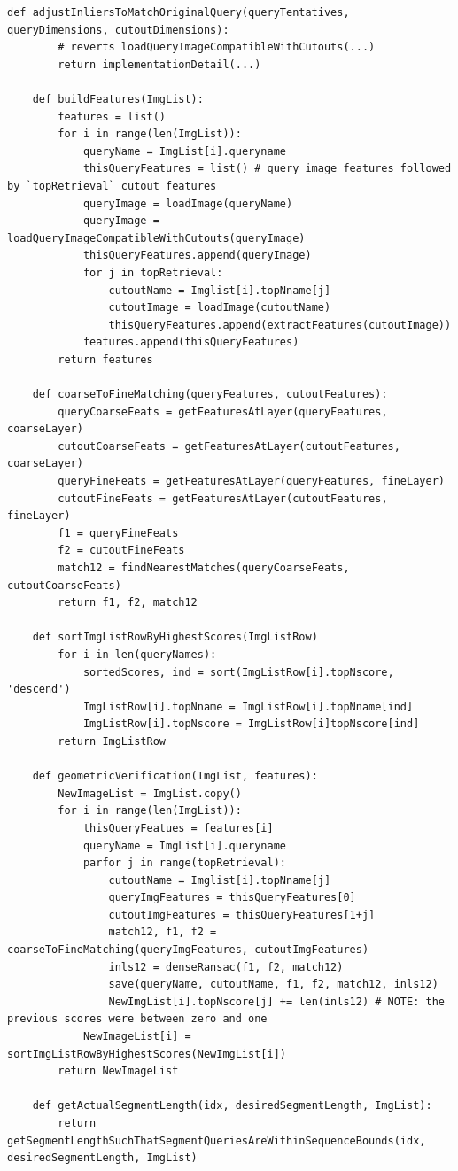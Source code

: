 \documentclass[twoside]{ctuthesis}
\theoremstyle{plain}
\theoremstyle{definition}
\theoremstyle{note}
\newcommand{\todo}[1][]{%
\ifthenelse{\isempty{#1}}{\textbf{TODO}}{\textbf{TODO: #1}}%
}
\begin{document}
\begin{lstlisting}[style=pseudocode, caption={InLocCIIRC pseudocode. \todo[pseudocode review.]}]
	def adjustInliersToMatchOriginalQuery(queryTentatives, queryDimensions, cutoutDimensions):
		# reverts loadQueryImageCompatibleWithCutouts(...)
		return implementationDetail(...)

	def buildFeatures(ImgList):
		features = list()
		for i in range(len(ImgList)):
			queryName = ImgList[i].queryname
			thisQueryFeatures = list() # query image features followed by `topRetrieval` cutout features
			queryImage = loadImage(queryName)
			queryImage = loadQueryImageCompatibleWithCutouts(queryImage)
			thisQueryFeatures.append(queryImage)
			for j in topRetrieval:
				cutoutName = Imglist[i].topNname[j]
				cutoutImage = loadImage(cutoutName)
				thisQueryFeatures.append(extractFeatures(cutoutImage))
			features.append(thisQueryFeatures)
		return features

	def coarseToFineMatching(queryFeatures, cutoutFeatures):
		queryCoarseFeats = getFeaturesAtLayer(queryFeatures, coarseLayer)
		cutoutCoarseFeats = getFeaturesAtLayer(cutoutFeatures, coarseLayer)
		queryFineFeats = getFeaturesAtLayer(queryFeatures, fineLayer)
		cutoutFineFeats = getFeaturesAtLayer(cutoutFeatures, fineLayer)
		f1 = queryFineFeats
		f2 = cutoutFineFeats
		match12 = findNearestMatches(queryCoarseFeats, cutoutCoarseFeats)
		return f1, f2, match12

	def sortImgListRowByHighestScores(ImgListRow)
		for i in len(queryNames):
			sortedScores, ind = sort(ImgListRow[i].topNscore, 'descend')
			ImgListRow[i].topNname = ImgListRow[i].topNname[ind]
			ImgListRow[i].topNscore = ImgListRow[i]topNscore[ind]
		return ImgListRow

	def geometricVerification(ImgList, features):
		NewImageList = ImgList.copy()
		for i in range(len(ImgList)):
			thisQueryFeatues = features[i]
			queryName = ImgList[i].queryname 
			parfor j in range(topRetrieval):
				cutoutName = Imglist[i].topNname[j]
				queryImgFeatures = thisQueryFeatures[0]
				cutoutImgFeatures = thisQueryFeatures[1+j]
				match12, f1, f2 = coarseToFineMatching(queryImgFeatures, cutoutImgFeatures)
				inls12 = denseRansac(f1, f2, match12)
				save(queryName, cutoutName, f1, f2, match12, inls12)
				NewImgList[i].topNscore[j] += len(inls12) # NOTE: the previous scores were between zero and one
			NewImageList[i] = sortImgListRowByHighestScores(NewImgList[i])
		return NewImageList

	def getActualSegmentLength(idx, desiredSegmentLength, ImgList):
		return getSegmentLengthSuchThatSegmentQueriesAreWithinSequenceBounds(idx, desiredSegmentLength, ImgList)


\end{lstlisting}
\end{document}
